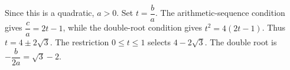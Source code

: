 Since this is a quadratic, $a>0$. Set $t=\dfrac{b}{a}$. The arithmetic-sequence condition gives $\dfrac{c}{a}=2t-1$, while the double-root condition gives $t^2=4(2t-1)$. Thus $t=4\pm2\sqrt3$. The restriction $0\le t\le1$ selects $4-2\sqrt3$. The double root is $-\dfrac{b}{2a}=\boxed{\sqrt3-2}$.
